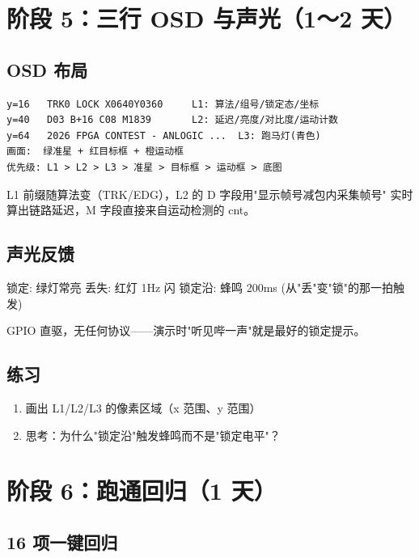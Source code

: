 \documentclass[11pt]{ctexart}
\begin{document}
\section{阶段 5：三行 OSD 与声光（1～2 天）}

\subsection{OSD 布局}

\begin{Verbatim}
y=16   TRK0 LOCK X0640Y0360     L1: 算法/组号/锁定态/坐标
y=40   D03 B+16 C08 M1839       L2: 延迟/亮度/对比度/运动计数
y=64   2026 FPGA CONTEST - ANLOGIC ...  L3: 跑马灯(青色)
画面:  绿准星 + 红目标框 + 橙运动框
优先级: L1 > L2 > L3 > 准星 > 目标框 > 运动框 > 底图
\end{Verbatim}

L1 前缀随算法变（TRK/EDG），L2 的 D 字段用"显示帧号减包内采集帧号"
实时算出链路延迟，M 字段直接来自运动检测的 cnt。

\subsection{声光反馈}

\begin{Verilog}
锁定:  绿灯常亮
丢失:  红灯 1Hz 闪
锁定沿: 蜂鸣 200ms (从"丢"变"锁"的那一拍触发)
\end{Verilog}

GPIO 直驱，无任何协议——演示时"听见哔一声"就是最好的锁定提示。

\subsection{练习}

\begin{enumerate}
  \item 画出 L1/L2/L3 的像素区域（x 范围、y 范围）
  \item 思考：为什么"锁定沿"触发蜂鸣而不是"锁定电平"？
\end{enumerate}

\section{阶段 6：跑通回归（1 天）}

\subsection{16 项一键回归}
\end{document}
